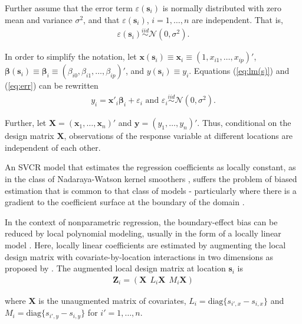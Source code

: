 \documentclass[authoryear, review, 11pt]{elsarticle}
\begin{document}
	Further assume that the error term $\varepsilon(\bm{s}_i)$ is normally distributed with zero mean and variance $\sigma^2$, and that $\varepsilon(\bm{s}_i)$, $i=1, \dots, n$ are independent. That is,
	\begin{align} \label{eq:err}
		\varepsilon(\bm{s}_i) \overset{iid}{\sim} \mathcal{N} \left( 0,\sigma^2 \right).
	\end{align}
	
  In order to simplify the notation, let $\bm{x}(\bm{s}_i) \equiv \bm{x}_i \equiv \left( 1, x_{i1}, \dots, x_{ip} \right)'$, $\bm{\beta}(\bm{s}_i) \equiv \bm{\beta}_i \equiv \left(\beta_{i0}, \beta_{i1}, \dots, \beta_{ip} \right)'$, and $y(\bm{s}_i) \equiv y_i$.  Equations (\ref{eq:lm(s)}) and (\ref{eq:err}) can be rewritten
  \begin{align}
    y_i = \bm{x}'_i \bm{\beta}_i + \varepsilon_i \text{ and } \varepsilon_i \overset{iid}{\sim} \mathcal{N} \left( 0,\sigma^2 \right).
  \end{align}
	
  Further, let $\bm{X} = \left( \bm{x}_1, \dots, \bm{x}_n \right)'$ and $\bm{y} = \left( y_1, \dots, y_n \right)'$. Thus, conditional on the design matrix $\bm{X}$, observations of the response variable at different locations are independent of each other.
  
  An SVCR model that estimates the regression coefficients as locally constant, as in the class of Nadaraya-Watson kernel smoothers \citep{Hardle-1990}, suffers the problem of biased estimation that is common to that class of models - particularly where there is a gradient to the coefficient surface at the boundary of the domain \citep{Hastie:1993b}.

  In the context of nonparametric regression, the boundary-effect bias can be reduced by local polynomial modeling, usually in the form of a locally linear model \citep{Fan-1996}. Here, locally linear coefficients are estimated by augmenting the local design matrix with covariate-by-location interactions in two dimensions as proposed by \cite{Wang:2008b}. The augmented local design matrix at location $\bm{s}_i$ is
  \begin{align}
    \bm{Z}_i = \left( \bm{X}  \:\: L_i \bm{X} \:\: M_i \bm{X} \right)
  \end{align} 
  
  where $\bm{X}$ is the unaugmented matrix of covariates, $L_i = \text{diag}\{s_{i',x} - s_{i,x}\}$ and $M_i = \text{diag}\{s_{i',y} - s_{i,y}\}$ for $i' = 1, \dots, n$.
  
\end{document}
